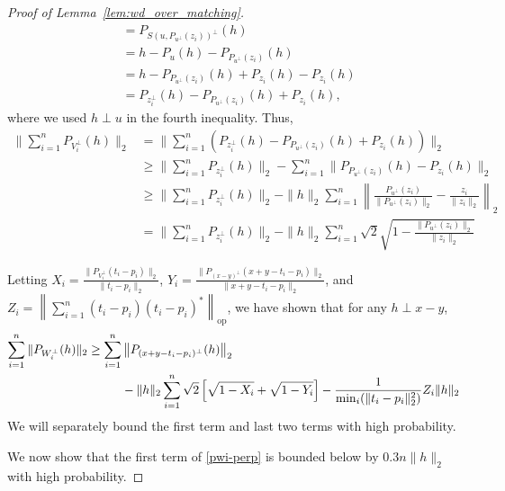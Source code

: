 \begin{proof}[Proof of Lemma~\ref{lem:wd_over_matching}]
\begin{align*}
&= P_{S(u,P_{u^\perp} (z_i))^\perp} (h) \\
& = h - P_{u}(h) - P_{P_{u^\perp} (z_i)}(h) \\
& = h - P_{P_{u^\perp} (z_i)}(h) + P_{z_i} (h) - P_{z_i} (h)\\
& =  P_{z_i^\perp} (h) - P_{P_{u^\perp} (z_i)}(h) + P_{z_i} (h),
\end{align*}
where we used $h \perp u$ in the fourth inequality. 
Thus,
\begin{align*}
\| \sum_{i=1}^n P_{V_i^\perp}( h)\|_2 &= \| \sum_{i=1}^n \left(P_{z_i^\perp}(h)  - P_{P_{u^\perp} (z_i)}(h) + P_{z_i} (h) \right) \|_2 \\
&\geq \| \sum_{i=1}^n P_{z_i^\perp}(h)\|_2 - \sum_{i=1}^n \| P_{P_{u^\perp} (z_i)}(h) - P_{z_i} (h) \|_2 \\
& \geq \| \sum_{i=1}^n P_{z_i^\perp}(h)\|_2 - \|h\|_2 \sum_{i=1}^n \left \| \frac{P_{u^\perp} (z_i)}{\|P_{u^\perp} (z_i)\|_2} - \frac{z_i}{\|z_i\|_2} \right \|_2 \\
& = \| \sum_{i=1}^n P_{z_i^\perp}(h)\|_2 - \|h\|_2 \sum_{i=1}^n \sqrt{2} \sqrt{1- \frac{\|P_{u^\perp} (z_i)\|_2}{\|z_i\|_2}}
\end{align*}

Letting $X_i = \frac{\| P_{V_i^\perp}(t_i-p_i) \|_2}{\|t_i-p_i\|_2}$, $Y_i = \frac{\| P_{(x-y)^\perp} (x+y - t_i-p_i) \|_2}{\|x+y - t_i-p_i\|_2}$, and $Z_i = \left \|\sum_{i=1}^n (t_i-p_i)(t_i-p_i)^*\right\|_{\text{op}}$, we have shown that for any $h \perp x-y$,
\begin{align}
\sum_{i=1}^n \| P_{W_i^\perp}(h)\|_2  \notag
\geq \sum_{i=1}^n &\left \| P_{(x+y-t_i - p_i)^\perp}(h)\right \|_2 \\&-  \|h\|_2 \sum_{i=1}^n \sqrt{2}\left[ \sqrt{1 - X_i} + \sqrt{1 - Y_i} \right]  - \frac{1}{\min_i(\|t_i - p_i\|_2^2)}Z_i\|h\|_2 \label{pwi-perp}
\end{align}
We will separately bound the first term and last two terms with high probability.  



We now show that the first term of \eqref{pwi-perp} is bounded below by $0.3 n \|h\|_2$ with high probability.


\end{proof}

